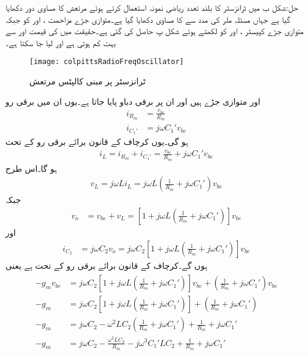 حل:شکل  ب میں ٹرانزسٹر کا بلند تعدد ریاضی نمونہ استعمال کرتے ہوئے مرتعش کا مساوی دور دکھایا گیا ہے جہاں مسئلہ ملر کی مدد سے  کا مساوی  دکھایا گیا ہے۔متوازی جڑے مزاحمت ،  اور  کو  جبکہ متوازی جڑے کپیسٹر ،  اور  کو  لکھتے ہوئے شکل  پ حاصل کی گئی ہے۔حقیقت میں  کی قیمت اور  سے بہت کم ہوتی ہے اور  لیا جا سکتا ہے۔  
\begin{figure}
\centering
\texttt{[image: colpittsRadioFreqOscillator]}
\caption{ٹرانزسٹر پر مبنی کالپٹس مرتعش}
\label{شکل_مرتعش_کالپٹس}
\end{figure}
 اور  متوازی جڑے ہیں اور ان پر برقی دباو  پایا جاتا ہے۔یوں ان میں برقی رو
\begin{align*}
i_{R_m}&=\frac{v_{be}}{R_m}\\
i_{C_1'}&=j \omega C_1' v_{be}
\end{align*}
ہو گی۔یوں کرچاف کے قانون برائے برقی رو کے تحت
\begin{align*}
i_L=i_{R_m}+i_{C_1'}=\frac{v_{be}}{R_m}+j \omega C_1' v_{be}
\end{align*}
ہو گا۔اس طرح
\begin{align*}
v_L=j \omega L i_L=j \omega L \left(\frac{1}{R_m}+j \omega C_1' \right) v_{be}
\end{align*}
جبکہ
\begin{align*}
v_o&=v_{be}+v_L=\left[1+ j \omega L \left(\frac{1}{R_m}+j \omega C_1' \right) \right] v_{be}
\end{align*}
اور
\begin{align*}
i_{C_2}&=j \omega C_2 v_o=j \omega C_2 \left[1+ j \omega L \left(\frac{1}{R_m}+j \omega C_1' \right) \right] v_{be}
\end{align*}
ہوں گے۔کرچاف کے قانون برائے برقی رو کے تحت  ہے یعنی
\begin{gather}
\begin{aligned} \label{مساوات_مرتعش_ٹرانزسٹر_کالپٹس_مثال_الف}
-g_m v_{be}&=j \omega C_2 \left[1+ j \omega L \left(\frac{1}{R_m}+j \omega C_1' \right) \right] v_{be}+\left(\frac{1}{R_m}+j \omega C_1'\right) v_{be}\\
-g_m&=j \omega C_2 \left[1+ j \omega L \left(\frac{1}{R_m}+j \omega C_1' \right) \right] +\left(\frac{1}{R_m}+j \omega C_1'\right)\\
-g_m&=j \omega C_2 - \omega^2 L C_2 \left(\frac{1}{R_m}+j \omega C_1' \right)  +\frac{1}{R_m}+j \omega C_1'\\
-g_m&=j \omega C_2 -\frac{ \omega^2 L C_2 }{R_m}-j \omega^3 C_1' L C_2  +\frac{1}{R_m}+j \omega C_1'
\end{aligned}
\end{gather}
